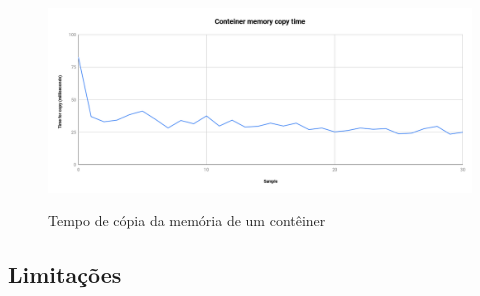 \documentclass[conference]{IEEEtran}
\begin{document}

\begin{figure}[htb!]
\footnotesize
\caption{Tempo de cópia da memória de um contêiner}
\includegraphics[scale=0.40]{memoria_copia_ieee.png}
\centering
\label{fig:memoria_copia}
\end{figure}

\subsection{Limitações}
\end{document}
